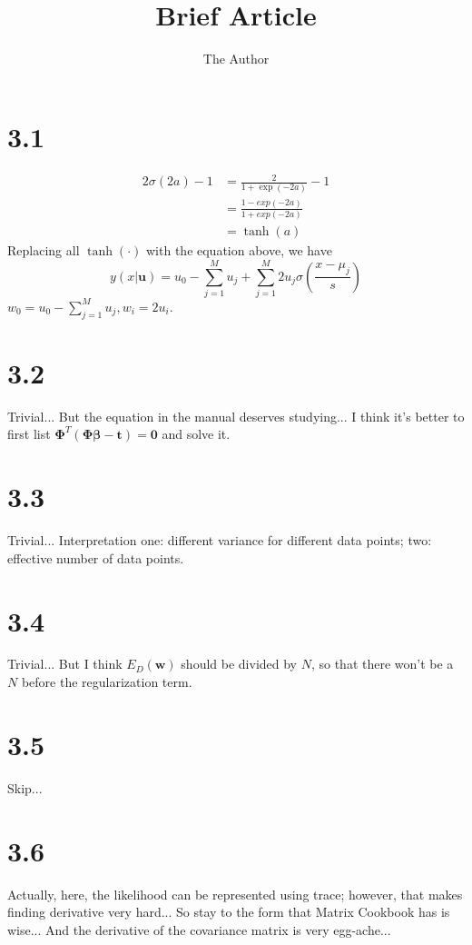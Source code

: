 \documentclass[12pt]{article}
\title{Brief Article}
\author{The Author}
\newcommand{\vect}[1]{\boldsymbol{#1}}
\begin{document}
\maketitle





\section{3.1}
\begin{align}
2\sigma(2a) - 1 &= \frac{2}{1+\exp(-2a)} - 1 \\
& = \frac{1-exp(-2a)}{1+exp(-2a)}\\
& = \tanh(a)
\end{align}
Replacing all $\tanh(\cdot) $ with the equation above, we have
\begin{equation}
    y(x|\vect{u}) = u_0 - \sum_{j=1}^{M} u_j + \sum_{j=1}^{M} 2u_j \sigma(\frac{x-\mu_j}{s})
\end{equation}
$w_0 = u_0 - \sum_{j=1}^{M} u_j, w_i = 2u_i$.

\section{3.2}
Trivial... But the equation in the manual deserves studying... I think it's better to first list $ \vect{\Phi}^T(\vect{\Phi}\vect{\beta} - \vect{t} ) = \vect{0}$ and solve it.

\section{3.3}
Trivial... Interpretation one: different variance for different data points; two: effective number of data points.

\section{3.4}
Trivial... But I think $E_D(\vect{w})$ should be divided by $N$, so that there won't be a $N$ before the regularization term.

\section{3.5}
Skip...

\section{3.6}
Actually, here, the likelihood can be represented using trace; however, that makes finding derivative very hard... So stay to the form that Matrix Cookbook has is wise... And the derivative of the covariance matrix is very egg-ache...
\end{document}

